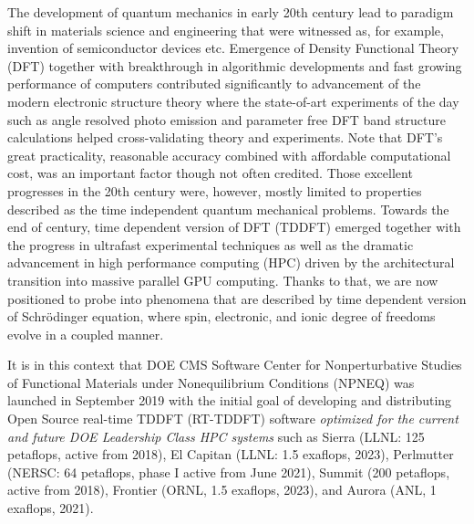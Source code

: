 The development of quantum mechanics in early 20th century lead to paradigm shift in materials science and engineering that were witnessed as, for example, invention of semiconductor devices etc. 
Emergence of Density Functional Theory (DFT)\cite{HohenbergKohn1964,KohnSham1965} together with breakthrough in algorithmic developments\cite{cooley1965,Cohen1975,Hamann1979,CarParrinello1985,Martin1988,Hamann1989,Vanderbilt1990,Payne1992,Bloechl1994,Klesse1999} and fast growing performance of computers contributed significantly to advancement of the modern electronic structure theory where the state-of-art experiments of the day such as angle resolved photo emission and parameter free DFT band structure calculations helped cross-validating theory and experiments. 
Note that DFT's great practicality, reasonable accuracy combined with affordable computational cost, was an important factor though not often credited.
Those excellent progresses in the 20th century were, however, mostly limited to properties described as the time independent quantum mechanical problems. 
Towards the end of century, time dependent version of DFT (TDDFT) emerged \cite{RungeGross1984} together with the progress in ultrafast experimental techniques as well as the dramatic advancement in high performance computing (HPC) driven by the architectural transition into massive parallel GPU computing.
Thanks to that, we are now positioned to probe into phenomena that are described by time dependent version of Schr\"{o}dinger equation, where spin, electronic, and ionic degree of freedoms evolve in a coupled manner.

It is in this context that DOE CMS Software Center for Nonperturbative Studies of Functional Materials under Nonequilibrium Conditions (NPNEQ) was launched in September 2019 with the initial goal of developing and distributing Open Source real-time TDDFT (RT-TDDFT) software \emph{optimized for the current and future DOE Leadership Class HPC systems} such as 
	Sierra (LLNL: 125 petaflops, active from 2018), 
	El Capitan (LLNL: 1.5 exaflops, 2023), 
	Perlmutter (NERSC: 64 petaflops, phase I active from June 2021), 
	Summit (200 petaflops, active from 2018), 
	Frontier (ORNL, 1.5 exaflops, 2023), 
	and Aurora (ANL, 1 exaflops, 2021). 

